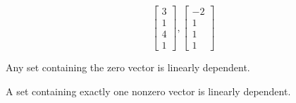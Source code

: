 \documentclass{ximera}
\begin{document}
\begin{problem}
\begin{problem}
\begin{multipleChoice}
 \end{multipleChoice}
\end{problem}

\begin{problem}
$$\begin{bmatrix}3\\1\\4\\1\end{bmatrix}, \begin{bmatrix}-2\\1\\1\\1\end{bmatrix}$$

\begin{multipleChoice}
 \end{multipleChoice}
\end{problem}

\end{problem}

\begin{problem} 
\begin{problem}
Any set containing the zero vector is linearly dependent.
\begin{multipleChoice}
 \end{multipleChoice}
 \end{problem}
\begin{problem}
A set containing exactly one nonzero vector is linearly dependent.
\begin{multipleChoice}
 \end{multipleChoice}
\end{problem}

\end{problem}
\end{document}
